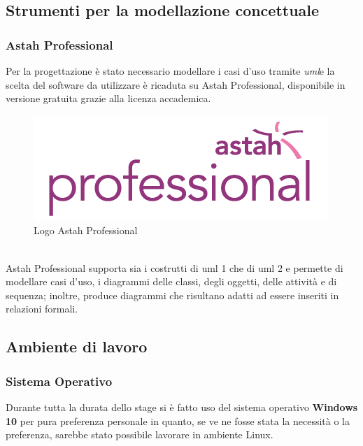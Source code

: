 \subsection{Strumenti per la modellazione concettuale}
\subsubsection{Astah Professional}
Per la progettazione è stato necessario modellare i casi d'uso tramite \emph{\gls{uml}}\glsfirstoccur e la scelta del software da utilizzare è ricaduta su Astah Professional, disponibile in versione gratuita grazie alla licenza accademica.
\begin{figure}[h]
	\centering
	\includegraphics[scale=1]{immagini/astah}
	\caption{Logo Astah Professional}
\end{figure}
\\
Astah Professional supporta sia i costrutti di \gls{uml} 1 che di \gls{uml} 2 e permette di modellare casi d’uso, i diagrammi delle classi, degli oggetti, delle attività e di sequenza; inoltre, produce diagrammi che risultano adatti ad essere inseriti in relazioni formali.
\subsection{Ambiente di lavoro}
\subsubsection{Sistema Operativo}
Durante tutta la durata dello stage si è fatto uso del sistema operativo \textbf{Windows 10} per pura preferenza personale in quanto, se ve ne fosse stata la necessità o la preferenza, sarebbe stato possibile lavorare in ambiente Linux.

